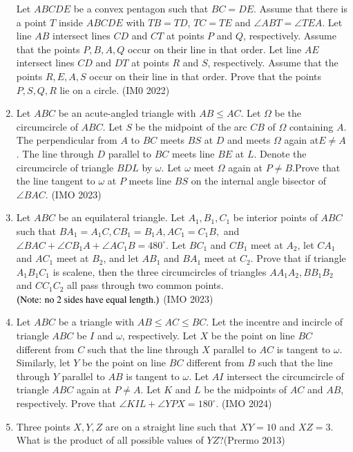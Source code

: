\begin{enumerate}
Let $ABCDE$  be a convex pentagon such that  $BC = DE$.  Assume that there is a point  $T$  inside  $ABCDE$ with  $TB = TD$,  $TC = TE$  and  $\angle{ABT} = \angle{TEA}$.  Let line  $AB$  intersect 
lines $CD$  and  $CT$  at points  $P$  and $Q$,  respectively. Assume that the points  $P, B, A, Q$  occur on their line in that order. Let line  $AE$  intersect lines  $CD$  and  $DT$  at points  $R$  and  $S$,  respectively. Assume 
that the points $ R, E, A, S $ occur on their line in that order. Prove that the points $ P, S, Q, R $ lie on a circle. \hfill(IM0 2022)
\item
Let  $ABC$ be an acute-angled triangle with  $AB \leq AC$. Let $\Omega$  be the circumcircle of  $ABC$.  Let  $S$ be the midpoint of the arc  $CB$  of  $\Omega$ containing $A$.  The perpendicular from $A$  to  $BC$ meets  $BS$  at  $D$  and meets  $\Omega$  again at$E \neq A$. The line through $
D$ parallel to  $BC$  meets line  $BE$ at  $L$.  Denote the circumcircle of triangle  $BDL$  by  $\omega$.  Let  $\omega$  meet  $\Omega$  again at  $P \neq B$.Prove that the line tangent to $\omega$ at  $P$  meets line $BS$  on the internal angle bisector of  $\angle{BAC}$. \hfill(IMO 2023)
\item
Let  $ABC$  be an equilateral triangle. Let $A_{1}, B_{1}, C_{1}$  be interior points of  $ABC$  such that $ BA_{1} = A_{1}C, CB_{1} = B_{1}A, AC_{1} = C_{1}B,$  and $\angle{BAC} + \angle{CB_{1}A} + \angle{AC_{1}B} = 480^{\circ}.$  Let $ BC_{1}$ and $CB_{1}$  meet at $A_{2}$,  let  $CA_{1}$ and  $A
C_{1}$  meet at  $B_{2}$,  and let  $AB_{1}$ and  $BA_{1}$  meet at  $C_{2}$. Prove that if triangle  $A_{1}B_{1}C_{1}$  is scalene, then the three circumcircles of triangles $AA_{1}A_{2}, BB_{1}B_{2}$  and  $CC_{1}C_{2}$ all pass through two common points.
$\left(\text{Note: no 2 sides have equal length.}\right)$ \hfill(IMO 2023)
\item
Let  $ABC$  be a triangle with $ AB \leq AC \leq BC $.  Let the incentre and incircle of triangle   $ABC$  be  $I$ and  $\omega$, respectively. Let $X$ be the point on line  $BC$  different from  $C$  such that the line   through  $X$  parallel to  $AC$  is tangent to  $\omega$.  Similarly, let  $
Y$ be the point on line  $BC$  different from  $B$  such that the line through  $Y$ parallel to  $AB$  is tangent to  $\omega$.  Let $AI$  intersect the circumcircle of  triangle $ABC$  again at  $P \neq A$. Let  $K$  and $L$  be the midpoints of  $AC$  and  $AB$,  respectively.  Prove that  $\angle{KIL} + \angle{YPX} = 180^{\circ}.$ \hfill(IMO 2024)
\item Three points $ X, Y, Z $ are on a straight line such that $ XY = 10 $ and $ XZ = 3 $. What is the product of all possible values of $ YZ $?\hfill(Prermo 2013)


\end{enumerate}
